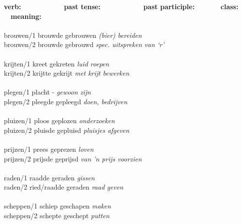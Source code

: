 \begin{tabbing}
{\bf verb:}   \ \ \ \ \ \ \ \ \ \ \ \      \=   
{\bf past tense:}  \ \ \ \ \ \ \ \ \ \ \ \  \=    
{\bf past participle:}  \ \ \ \ \ \ \  \=
{\bf class:} \ \ \= 
{\bf meaning:} \\
           \>             \>              \>        \>          \\
brouwen/1  \> brouwde     \>  gebrouwen   \>  [15]  \> {\em (bier) bereiden} \\
brouwen/2  \> brouwde     \>  gebrouwd    \>  [3]   \> 
{\em spec. uitspreken van `r'} \\
           \>             \>              \>        \>          \\
krijten/1  \> kreet       \>  gekreten    \>  [7]   \> {\em luid roepen} \\
krijten/2  \> krijtte     \>  gekrijt     \>  [3]   \> 
{\em met krijt bewerken} \\
           \>             \>              \>        \>          \\
plegen/1   \> placht      \>      -       \>  [13]  \> {\em gewoon zijn} \\
plegen/2   \> pleegde     \>  gepleegd    \>  [3]   \> {\em doen, bedrijven} \\
           \>             \>              \>        \>          \\
pluizen/1  \> ploos       \>  geplozen    \>  [7]   \> {\em onderzoeken} \\
pluizen/2  \> pluisde     \>  gepluisd    \>  [3]   \> {\em pluisjes afgeven} \\
           \>             \>              \>        \>          \\
prijzen/1  \> prees       \>  geprezen    \>  [7]   \> {\em loven} \\
prijzen/2  \> prijsde     \>  geprijsd    \>  [3]   \> 
{\em van 'n prijs voorzien} \\
           \>             \>              \>        \>          \\
raden/1    \> raadde      \>  geraden     \>  [15]   \> {\em gissen} \\
raden/2    \> ried/raadde \>  geraden     \>  [15,5] \> {\em raad geven} \\
           \>             \>              \>        \>          \\
scheppen/1 \> schiep      \>  geschapen   \>  [11]  \> {\em maken} \\
scheppen/2 \> schepte     \>  geschept    \>  [3]   \> {\em putten} \\

\end{tabbing}
